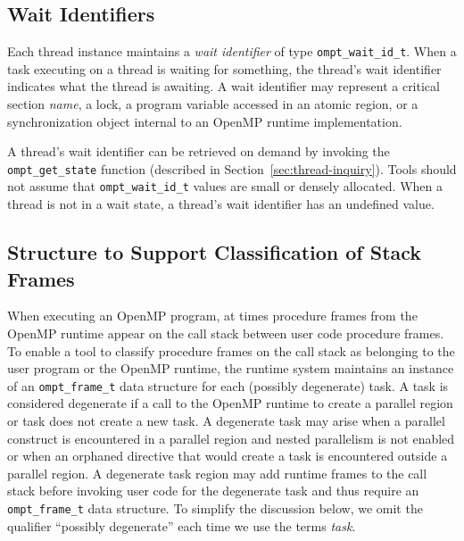 \documentclass{article}
\begin{document}
\subsection{Wait Identifiers}
Each thread instance maintains a {\em wait identifier} of type \verb|ompt_wait_id_t|. 
When a task executing on a thread is waiting for something, the thread's wait identifier indicates what the thread is awaiting. 
A wait identifier may represent a critical section {\em name}, a lock,  a program variable accessed in an atomic region, or a synchronization object internal to an OpenMP runtime implementation. 

A thread's wait identifier can be retrieved on demand by invoking the \verb|ompt_get_state| function (described in Section~\ref{sec:thread-inquiry}).
Tools should not assume that \verb|ompt_wait_id_t| values are small or densely allocated. 
When a thread is not in a wait state, a thread's wait identifier has an undefined value.
 
\subsection{Structure to Support Classification of Stack Frames}

  When executing an OpenMP program, at times procedure frames from the OpenMP runtime appear on the call stack between user code procedure frames.
  To enable a tool to classify procedure frames on the call stack as belonging to the user program or the OpenMP runtime,
  the runtime system maintains an instance of an \verb|ompt_frame_t| data structure 
  for each (possibly degenerate) task. A task is considered degenerate if a call to the OpenMP runtime to create a parallel 
  region or task does not create a new task. A degenerate task may arise when a parallel construct is encountered
   in a parallel region and nested parallelism is not enabled or when an orphaned directive that would create a task is encountered outside a parallel region.
  A degenerate task region may add runtime frames to the call stack before 
  invoking user code for the degenerate task and thus require an \verb|ompt_frame_t| data structure. 
  To simplify the discussion below, we omit the qualifier ``possibly degenerate'' each time we use the terms {\em task}.
\end{document}
